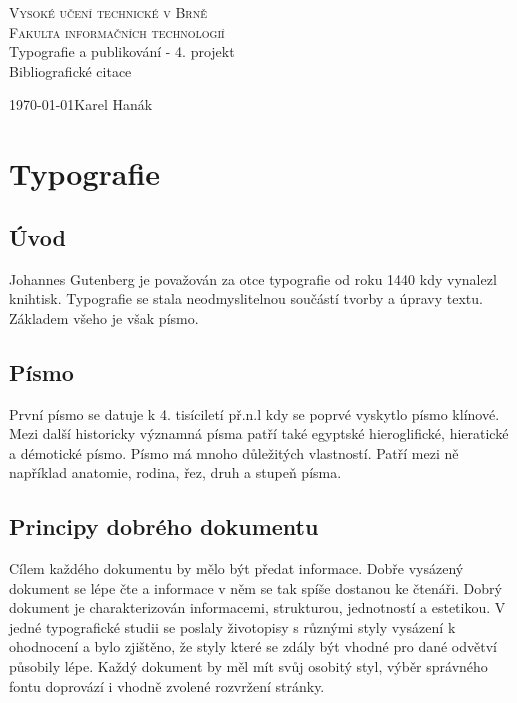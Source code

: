 \documentclass[11pt,a4paper]{article}
\begin{document}
\begin{titlepage}
\begin{center}
{\Huge \textsc{Vysoké učení technické v Brně\\[0,3em]{\huge Fakulta informačních technologií}}}\\
{{\LARGE Typografie a publikování - 4. projekt}\\[0,4em]{\Huge Bibliografické citace}}\\
\end{center}
{\Large \today \hfill Karel Hanák}
\end{titlepage}

\section{Typografie}
\subsection{Úvod}
Johannes Gutenberg je považován za otce typografie od roku 1440 kdy vynalezl knihtisk. \cite{haley} Typografie se stala neodmyslitelnou součástí tvorby a úpravy textu. Základem všeho je však písmo. 

\subsection{Písmo}
První písmo se datuje k 4. tisíciletí př.n.l kdy se poprvé vyskytlo písmo klínové. Mezi další historicky významná písma patří také egyptské hieroglifické, hieratické a démotické písmo. \cite{citarna} Písmo má mnoho důležitých vlastností. Patří mezi ně například anatomie, rodina, řez, druh a stupeň písma. \cite{scribus}

\subsection{Principy dobrého dokumentu}
Cílem každého dokumentu by mělo být předat informace. Dobře vysázený dokument se lépe čte a informace v něm se tak spíše dostanou ke čtenáři. Dobrý dokument je charakterizován informacemi, strukturou, jednotností a estetikou. \cite{cstug} V jedné typografické studii se poslaly životopisy s různými styly vysázení k ohodnocení a bylo zjištěno, že styly které se zdály být vhodné pro dané odvětví působily lépe. \cite{pov} Každý dokument by měl mít svůj osobitý styl, výběr správného fontu doprovází i vhodně zvolené rozvržení stránky. \cite{rmets}
\end{document}
